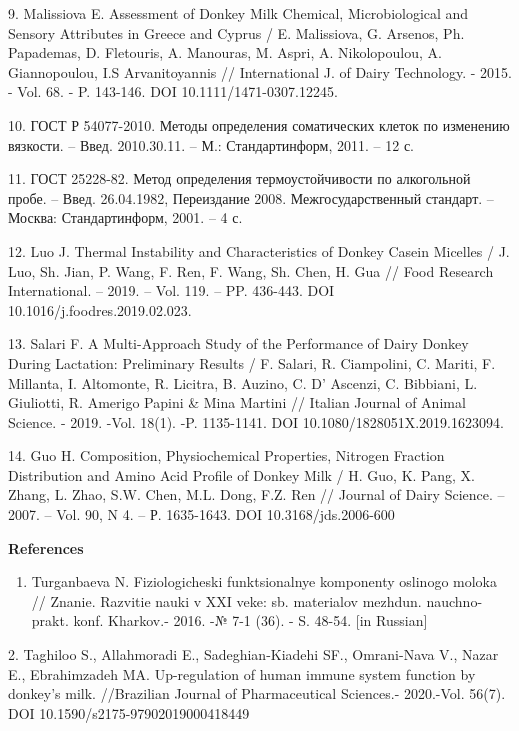 9. Malissiova E. Assessment of Donkey Milk Chemical, Microbiological and
Sensory Attributes in Greece and Cyprus / E. Malissiova, G. Arsenos, Ph.
Papademas, D. Fletouris, A. Manouras, M. Aspri, A. Nikolopoulou, A.
Giannopoulou, I.S Arvanitoyannis // International J. of Dairy
Technology. - 2015. - Vol. 68. - P. 143-146. DOI
10.1111/1471-0307.12245.

10. ГОСТ Р 54077-2010. Методы определения соматических клеток по
изменению вязкости. -- Введ. 2010.30.11. -- М.: Стандартинформ, 2011. --
12 с.

11. ГОСТ 25228-82. Метод определения термоустойчивости по алкогольной
пробе. -- Введ. 26.04.1982, Переиздание 2008. Межгосударственный
стандарт. -- Москва: Стандартинформ, 2001. -- 4 с.

12. Luo J. Thermal Instability and Characteristics of Donkey Casein
Micelles / J. Luo, Sh. Jian, P. Wang, F. Ren, F. Wang, Sh. Chen, H. Gua
// Food Research International. -- 2019. -- Vol. 119. -- PP. 436-443.
DOI 10.1016/j.foodres.2019.02.023.

13. Salari F. A Multi-Approach Study of the Performance of Dairy Donkey
During Lactation: Preliminary Results / F. Salari, R. Ciampolini, C.
Mariti, F. Millanta, I. Altomonte, R. Licitra, B. Auzino, C. D' Ascenzi,
C. Bibbiani, L. Giuliotti, R. Amerigo Papini \& Mina Martini // Italian
Journal of Animal Science. - 2019. -Vol. 18(1). -P. 1135-1141. DOI
10.1080/1828051X.2019.1623094.

14. Guo H. Composition, Physiochemical Properties, Nitrogen Fraction
Distribution and Amino Acid Profile of Donkey Milk / H. Guo, K. Pang, X.
Zhang, L. Zhao, S.W. Chen, M.L. Dong, F.Z. Ren // Journal of Dairy
Science. -- 2007. -- Vol. 90, N 4. -- Р. 1635-1643. DOI
10.3168/jds.2006-600

{\bfseries References}

\begin{enumerate}
\def\labelenumi{\arabic{enumi}.}
\item
  Turganbaeva N. Fiziologicheski funktsional\textquotesingle nye
  komponenty oslinogo moloka // Znanie. Razvitie nauki v XXI veke: sb.
  materialov mezhdun. nauchno-prakt. konf. Khar\textquotesingle kov.-
  2016. -№ 7-1 (36). - S. 48-54. {[}in Russian{]}
\end{enumerate}

2. Taghiloo S., Allahmoradi E., Sadeghian-Kiadehi SF., Omrani-Nava V.,
Nazar E., Ebrahimzadeh MA. Up-regulation of human immune system function
by donkey's milk. //Brazilian Journal of Pharmaceutical Sciences.-
2020.-Vol. 56(7). DOI 10.1590/s2175-97902019000418449

